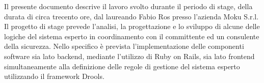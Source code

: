 \abstract

	Il presente documento descrive il lavoro svolto durante il periodo di stage, della durata di circa trecento ore, dal laureando Fabio Ros presso l’azienda Moku S.r.l. 
	Il progetto di stage prevede l'analisi, la progettazione e lo sviluppo di alcune delle logiche del sistema esperto in coordinamento con il committente ed un consulente della sicurezza.
	Nello specifico è prevista l'implementazione delle componenti software sia lato backend, mediante l'utilizzo di Ruby on Rails, sia lato frontend simultaneamente alla definizione delle regole di gestione del sistema esperto utilizzando il framework Drools.
